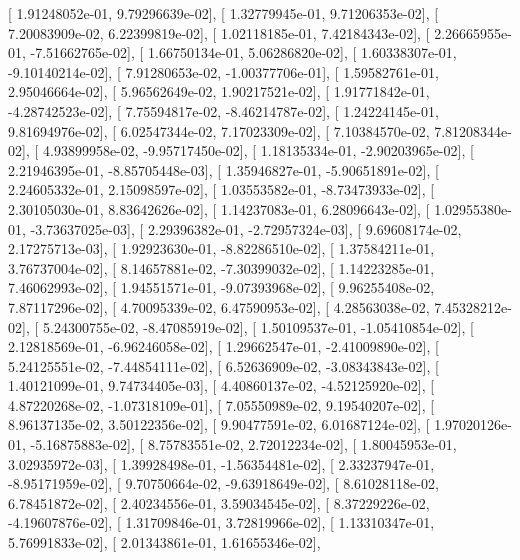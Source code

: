 \documentclass{article}
\begin{document}
       [  1.91248052e-01,   9.79296639e-02],
       [  1.32779945e-01,   9.71206353e-02],
       [  7.20083909e-02,   6.22399819e-02],
       [  1.02118185e-01,   7.42184343e-02],
       [  2.26665955e-01,  -7.51662765e-02],
       [  1.66750134e-01,   5.06286820e-02],
       [  1.60338307e-01,  -9.10140214e-02],
       [  7.91280653e-02,  -1.00377706e-01],
       [  1.59582761e-01,   2.95046664e-02],
       [  5.96562649e-02,   1.90217521e-02],
       [  1.91771842e-01,  -4.28742523e-02],
       [  7.75594817e-02,  -8.46214787e-02],
       [  1.24224145e-01,   9.81694976e-02],
       [  6.02547344e-02,   7.17023309e-02],
       [  7.10384570e-02,   7.81208344e-02],
       [  4.93899958e-02,  -9.95717450e-02],
       [  1.18135334e-01,  -2.90203965e-02],
       [  2.21946395e-01,  -8.85705448e-03],
       [  1.35946827e-01,  -5.90651891e-02],
       [  2.24605332e-01,   2.15098597e-02],
       [  1.03553582e-01,  -8.73473933e-02],
       [  2.30105030e-01,   8.83642626e-02],
       [  1.14237083e-01,   6.28096643e-02],
       [  1.02955380e-01,  -3.73637025e-03],
       [  2.29396382e-01,  -2.72957324e-03],
       [  9.69608174e-02,   2.17275713e-03],
       [  1.92923630e-01,  -8.82286510e-02],
       [  1.37584211e-01,   3.76737004e-02],
       [  8.14657881e-02,  -7.30399032e-02],
       [  1.14223285e-01,   7.46062993e-02],
       [  1.94551571e-01,  -9.07393968e-02],
       [  9.96255408e-02,   7.87117296e-02],
       [  4.70095339e-02,   6.47590953e-02],
       [  4.28563038e-02,   7.45328212e-02],
       [  5.24300755e-02,  -8.47085919e-02],
       [  1.50109537e-01,  -1.05410854e-02],
       [  2.12818569e-01,  -6.96246058e-02],
       [  1.29662547e-01,  -2.41009890e-02],
       [  5.24125551e-02,  -7.44854111e-02],
       [  6.52636909e-02,  -3.08343843e-02],
       [  1.40121099e-01,   9.74734405e-03],
       [  4.40860137e-02,  -4.52125920e-02],
       [  4.87220268e-02,  -1.07318109e-01],
       [  7.05550989e-02,   9.19540207e-02],
       [  8.96137135e-02,   3.50122356e-02],
       [  9.90477591e-02,   6.01687124e-02],
       [  1.97020126e-01,  -5.16875883e-02],
       [  8.75783551e-02,   2.72012234e-02],
       [  1.80045953e-01,   3.02935972e-03],
       [  1.39928498e-01,  -1.56354481e-02],
       [  2.33237947e-01,  -8.95171959e-02],
       [  9.70750664e-02,  -9.63918649e-02],
       [  8.61028118e-02,   6.78451872e-02],
       [  2.40234556e-01,   3.59034545e-02],
       [  8.37229226e-02,  -4.19607876e-02],
       [  1.31709846e-01,   3.72819966e-02],
       [  1.13310347e-01,   5.76991833e-02],
       [  2.01343861e-01,   1.61655346e-02],
\end{document}
